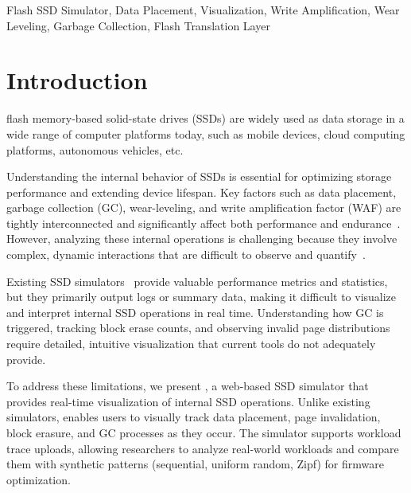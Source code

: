 \documentclass{ieeeaccess}
\begin{document}
\begin{keywords}
Flash SSD Simulator, Data Placement, Visualization, Write Amplification, Wear Leveling, Garbage Collection, Flash Translation Layer
\end{keywords}

\titlepgskip=-15pt

\maketitle
\section{Introduction}
\label{sec:introduction}
 flash memory-based solid-state drives (SSDs) are widely used as data storage in a wide range of computer platforms today, such as mobile devices, cloud computing platforms, autonomous vehicles, etc.

 

 

 

Understanding the internal behavior of SSDs is essential for optimizing storage performance and extending device lifespan. Key factors such as data placement, garbage collection (GC), wear-leveling, and write amplification factor (WAF) are tightly interconnected and significantly affect both performance and endurance~\cite{multistreamssd-hotstorage14, SEPBIT-usenixFAST, MiDAS-usenixFAST}. However, analyzing these internal operations is challenging because they involve complex, dynamic interactions that are difficult to observe and quantify~\cite{allocation-strategy-ics11, greedy-garbage-collection-PE11, Over-Provisioning-IEEE22}.

Existing SSD simulators~\cite{MQSim-USENIX18, SSDModel-USENIX-TC-08, SSDSim-ICS-11, NANDFlashSim-TOS-16, VSSIM-MSST-13, WiscSim-EuroSys-17, SimpleSSD-IEEE18, FEMU-FAST-18, FTLSim-ACM-2017} provide valuable performance metrics and statistics, but they primarily output logs or summary data, making it difficult to visualize and interpret internal SSD operations in real time. Understanding how GC is triggered, tracking block erase counts, and observing invalid page distributions require detailed, intuitive visualization that current tools do not adequately provide.

To address these limitations, we present \eyanassdsim, a web-based SSD simulator that provides real-time visualization of internal SSD operations. Unlike existing simulators, \eyanassdsim enables users to visually track data placement, page invalidation, block erasure, and GC processes as they occur. The simulator supports workload trace uploads, allowing researchers to analyze real-world workloads and compare them with synthetic patterns (sequential, uniform random, Zipf) for firmware optimization.
\end{document}
